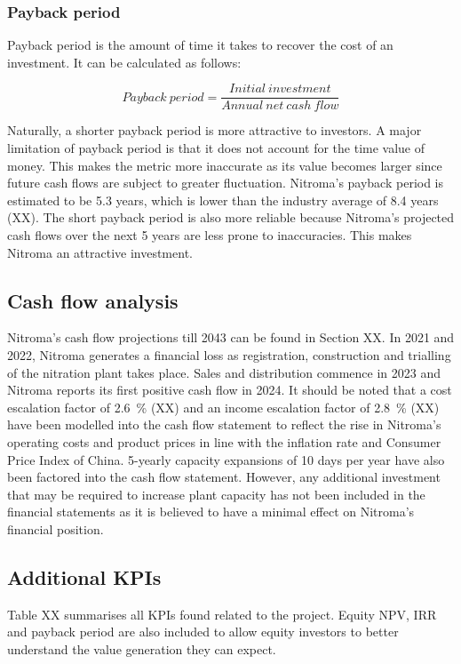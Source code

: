 

\subsubsection{Payback period}
\label{sec:pby}
Payback period is the amount of time it takes to recover the cost of an investment. It can be calculated as follows:

\begin{equation}
\label{eqn:payback}
    Payback\:period = \frac{Initial\:investment}{Annual\:net\:cash\:flow}
\end{equation}

Naturally, a shorter payback period is more attractive to investors. A major limitation of payback period is that it does not account for the time value of money. This makes the metric more inaccurate as its value becomes larger since future cash flows are subject to greater fluctuation. Nitroma’s payback period is estimated to be 5.3 years, which is lower than the industry average of 8.4 years (XX).  The short payback period is also more reliable because Nitroma’s projected cash flows over the next 5 years are less prone to inaccuracies. This makes Nitroma an attractive investment. 


\subsection{Cash flow analysis}
\label{sec:cash-flows}
Nitroma’s cash flow projections till 2043 can be found in Section XX. In 2021 and 2022, Nitroma generates a financial loss as registration, construction and trialling of the nitration plant takes place. Sales and distribution commence in 2023 and Nitroma reports its first positive cash flow in 2024. It should be noted that a cost escalation factor of \SI{2.6}{\percent} (XX) and an income escalation factor of \SI{2.8}{\percent} (XX) have been modelled into the cash flow statement to reflect the rise in Nitroma’s operating costs and product prices in line with the inflation rate and Consumer Price Index of China. 5-yearly capacity expansions of 10 days per year have also been factored into the cash flow statement. However, any additional investment that may be required to increase plant capacity has not been included in the financial statements as it is believed to have a minimal effect on Nitroma’s financial position.

\subsection{Additional KPIs}
Table XX summarises all KPIs found related to the project. Equity NPV, IRR and payback period are also included to allow equity investors to better understand the value generation they can expect. 